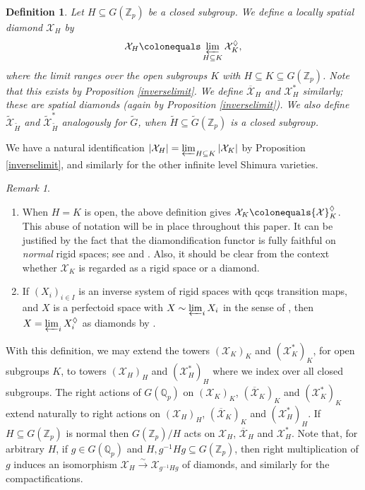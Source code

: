 \documentclass{amsart}
\newtheorem{defn}[subsubsection]{Definition}
\theoremstyle{remark}
\newtheorem{rem}[subsubsection]{Remark}
\numberwithin{equation}{subsection}
\newcommand{\Q}{\QQ}
\newcommand{\Z}{\ZZ}
\newcommand{\QQ}{{\mathbb Q}}
\newcommand{\ZZ}{{\mathbb Z}}
\newcommand{\cX}{{\mathcal X}}
\newcommand{\Zp}{\Z_p}
\newcommand{\Qp}{\Q_p}
\newcommand*{\invlim}{\varprojlim}
\newcommand{\toisom}{\xrightarrow{\sim}}
\newcommand{\tG}{\widetilde{G}}
\newcommand{\tH}{\widetilde{H}}
\newcommand{\ol}{\overline}
\newcommand{\wt}{\widetilde}
\newcommand{\sub}{\subseteq}
\newcommand{\defeq}{\colonequals}
\renewcommand{\(}{\left(}
\renewcommand{\)}{\right)}
\begin{document}
\begin{defn}
Let $H \sub G(\Zp)$ be a closed subgroup. We define a locally spatial diamond $\cX_H$ by
\[ 
\cX_H \defeq \varprojlim_{H \sub K}\cX^{\lozenge}_K, 
\]
where the limit ranges over the open subgroups $K$ with $H \sub K \sub G(\Zp)$. Note that this exists by Proposition \ref{inverselimit}. We define $\ol{\cX}_H$ and $\cX^{\ast}_{H}$ similarly; these are spatial diamonds (again by Proposition \ref{inverselimit}). We also define $\wt{\cX}_{\tH}$ and $\wt{\cX}^\ast_{\tH}$ analogously for $\tG$, when $\tH \sub \tG(\Zp)$ is a closed subgroup.
\end{defn} 

We have a natural identification $|\cX_H|=\invlim_{H \sub K}|\cX_K|$ by Proposition \ref{inverselimit}, and similarly for the other infinite level Shimura varieties.

\begin{rem} \leavevmode
\begin{enumerate}
\item When $H = K$ is open, the above definition gives $\cX_K \defeq \cX_K^{\lozenge}$. This abuse of notation will be in place throughout this paper. It can be justified by the fact that the diamondification functor is fully faithful on \emph{normal} rigid spaces; see \cite[Proposition 10.2.4]{berkeley-notes} and \cite[Theorem 8.2.3]{kedlaya-liu-2}. Also, it should be clear from the context whether $\cX_K$ is regarded as a rigid space or a diamond.

\item If $(X_{i})_{i\in I}$ is an inverse system of rigid spaces with qcqs transition maps, and $X$ is a perfectoid space with $X \sim \varprojlim_{i}X_{i}$ in the sense of \cite[Definition 2.4.1]{scholze-weinstein}, then $X=\varprojlim_{i}X_{i}^{\lozenge}$ as diamonds by \cite[Proposition 2.4.5]{scholze-weinstein}.
\end{enumerate}
\end{rem}

With this definition, we may extend the towers $(\cX_K)_K$ and $(\cX^{\ast}_K)_K$, for open subgroups $K$, to towers $(\cX_H)_H$ and $(\cX^{\ast}_H)_H$ where we index over all closed subgroups. The right actions of $G(\Qp)$ on $(\cX_K)_K$, $(\ol{\cX}_K)_K$ and $(\cX^{\ast}_K)_K$ extend naturally to right actions on $(\cX_H)_H$, $(\ol{\cX}_K)_K$ and $(\cX^{\ast}_H)_H$. If $H \sub G(\Zp)$ is normal then $G(\Zp)/H$ acts on $\cX_H$, $\ol{\cX}_H$ and $\cX^\ast_H$. Note that, for arbitrary $H$, if $g\in G(\Qp)$ and $H,g^{-1}H g \sub G(\Zp)$, then right multiplication of $g$ induces an isomorphism $\cX_H \toisom \cX_{g^{-1}H g}$ of diamonds, and similarly for the compactifications.
\end{document}
